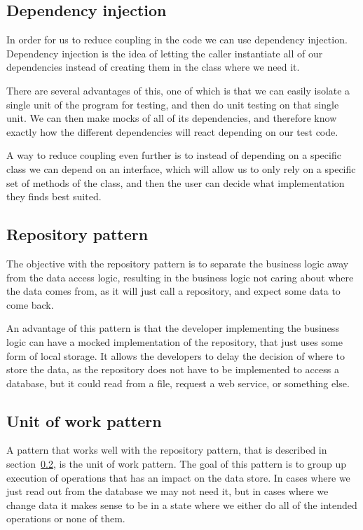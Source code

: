 \subsection{Dependency injection}
\label{sub:Dependency injection}
In order for us to reduce coupling in the code we can use dependency injection. Dependency injection is the idea of letting the caller instantiate all of our dependencies instead of creating them in the class where we need it.

There are several advantages of this, one of which is that we can easily isolate a single unit of the program for testing, and then do unit testing on that single unit. We can then make mocks of all of its dependencies, and therefore know exactly how the different dependencies will react depending on our test code\cite{dependency_injection}.

A way to reduce coupling even further is to instead of depending on a specific class we can depend on an interface, which will allow us to only rely on a specific set of methods of the class, and then the user can decide what implementation they finds best suited.

\subsection{Repository pattern}
\label{sub:Repository pattern}
The objective with the repository pattern is to separate the business logic away from the data access logic, resulting in the business logic not caring about where the data comes from, as it will just call a repository, and expect some data to come back.

An advantage of this pattern is that the developer implementing the business logic can have a mocked implementation of the repository, that just uses some form of local storage. It allows the developers to delay the decision of where to store the data, as the repository does not have to be implemented to access a database, but it could read from a file, request a web service, or something else\cite{repository_pattern}.

\subsection{Unit of work pattern}
\label{sub:Unit of work pattern}
A pattern that works well with the repository pattern, that is described in section~\ref{sub:Repository pattern}, is the unit of work pattern. The goal of this pattern is to group up execution of operations that has an impact on the data store. In cases where we just read out from the database we may not need it, but in cases where we change data it makes sense to be in a state where we either do all of the intended operations or none of them.

